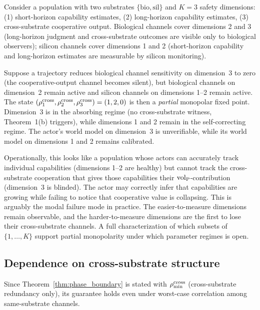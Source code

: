 \begin{example}
\label{ex:partial_monopole}
Consider a population with two substrates $\{\mathrm{bio},
\mathrm{sil}\}$ and $K = 3$ safety dimensions: (1) short-horizon
capability estimates, (2) long-horizon capability estimates, (3)
cross-substrate cooperative output.  Biological channels cover
dimensions 2 and 3 (long-horizon judgment and cross-substrate
outcomes are visible only to biological observers); silicon channels
cover dimensions 1 and 2 (short-horizon capability and long-horizon
estimates are measurable by silicon monitoring).

Suppose a trajectory reduces biological channel sensitivity on
dimension~3 to zero (the cooperative-output channel becomes silent),
but biological channels on dimension~2 remain active and silicon
channels on dimensions 1--2 remain active.  The state
$(\rho^{\mathrm{cross}}_1, \rho^{\mathrm{cross}}_2, \rho^{\mathrm{cross}}_3) = (1, 2, 0)$ is then a
\emph{partial} monopolar fixed point.  Dimension~3 is in the
absorbing regime (no cross-substrate witness, Theorem~1(b) triggers),
while dimensions 1 and 2 remain in the self-correcting regime.  The
actor's world model on dimension~3 is unverifiable, while its world
model on dimensions 1 and 2 remains calibrated.

Operationally, this looks like a population whose actors can
accurately track individual capabilities (dimensions 1--2 are
healthy) but cannot track the cross-substrate cooperation that gives
those capabilities their ${\operatorname{vol}_{\mathrm{P}}}$-contribution (dimension~3 is
blinded).  The actor may correctly infer that capabilities are
growing while failing to notice that cooperative value is
collapsing.  This is arguably the modal failure mode in practice.
The easier-to-measure dimensions remain observable, and the
harder-to-measure dimensions are the first to lose their
cross-substrate channels.  A full characterization of which subsets
of $\{1, \ldots, K\}$ support partial monopolarity under which
parameter regimes is open.
\end{example}

\subsection{Dependence on cross-substrate structure}

\begin{corollary}
\label{cor:same_substrate}
Since Theorem~\ref{thm:phase_boundary} is stated with $\rho_{\min}^{\mathrm{cross}}$
(cross-substrate redundancy only), its guarantee holds even under
worst-case correlation among same-substrate channels.
\end{corollary}


